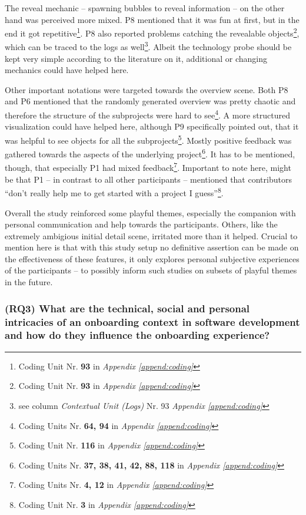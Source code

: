 The reveal mechanic -- spawning bubbles to reveal information -- on the other hand was perceived more mixed. P8 mentioned that it was fun at first, but in the end it got repetitive\footnote{Coding Unit Nr. \textbf{93} in \textit{Appendix \ref{append:coding}}}. P8 also reported problems catching the revealable objects\footnote{Coding Unit Nr. \textbf{93} in \textit{Appendix \ref{append:coding}}}, which can be traced to the logs as well\footnote{see column \textit{Contextual Unit (Logs)} Nr. 93 \textit{Appendix \ref{append:coding}}}. Albeit the technology probe should be kept very simple according to the literature on it, additional or changing mechanics could have helped here.

Other important notations were targeted towards the overview scene. Both P8 and P6 mentioned that the randomly generated overview was pretty chaotic and therefore the structure of the subprojects were hard to see\footnote{Coding Units Nr. \textbf{64, 94} in \textit{Appendix \ref{append:coding}}}. A more structured visualization could have helped here, although P9 specifically pointed out, that it was helpful to see objects for all the subprojects\footnote{Coding Unit Nr. \textbf{116} in \textit{Appendix \ref{append:coding}}}. Mostly positive feedback was gathered towards the aspects of the underlying project\footnote{Coding Units Nr. \textbf{37, 38, 41, 42, 88, 118} in \textit{Appendix \ref{append:coding}}}. It has to be mentioned, though, that especially P1 had mixed feedback\footnote{Coding Units Nr. \textbf{4, 12} in \textit{Appendix \ref{append:coding}}}. Important to note here, might be that P1 -- in contrast to all other participants -- mentioned that contributors \enquote{don't really help me to get started with a project I guess}\footnote{Coding Unit Nr. \textbf{3} in \textit{Appendix \ref{append:coding}}}.

Overall the study reinforced some playful themes, especially the companion with personal communication and help towards the participants. Others, like the extremely ambigious initial detail scene, irritated more than it helped. Crucial to mention here is that with this study setup no definitive assertion can be made on the effectiveness of these features, it only explores personal subjective experiences of the participants -- to possibly inform such studies on subsets of playful themes in the future.

\subsubsection*{(RQ3) What are the technical, social and personal intricacies of an onboarding context in software development and how do they influence the onboarding experience?}

